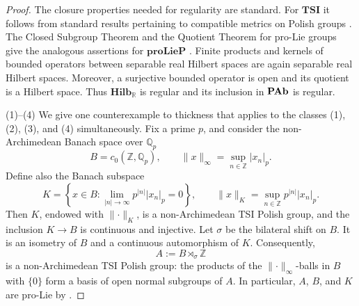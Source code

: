 \documentclass[12pt]{amsart}
\theoremstyle{definition}
\begin{document}
\begin{proof}
The closure properties needed for regularity are standard. For $\mathbf{TSI}$
it follows from standard results pertaining to compatible metrics on Polish
groups \cite[Section~2.2]{gao_invariant_2009}. The Closed Subgroup Theorem
and the Quotient Theorem for pro-Lie groups give the analogous assertions
for $\mathbf{proLieP}$ \cite[Chapter~3 and Theorem~4.1]{hofmann_lie_2007}.
Finite products and kernels of bounded operators between separable real
Hilbert spaces are again separable real Hilbert spaces. Moreover, a
surjective bounded operator is open and its quotient is a Hilbert space.
Thus $\mathbf{Hilb}_{\mathbb{R}}$ is regular and its inclusion in $\mathbf{%
PAb}$ is regular.

(1)--(4) We give one counterexample to thickness that applies to the classes
(1), (2), (3), and (4) simultaneously. Fix a prime $p$, and consider the
non-Archimedean Banach space over $\mathbb{Q}_{p}$ 
\begin{equation*}
B=c_{0}(\mathbb{Z},\mathbb{Q}_{p}),\qquad \lVert x\rVert _{\infty
}=\sup_{n\in \mathbb{Z}}\lvert x_{n}\rvert _{p}.
\end{equation*}%
Define also the Banach subspace 
\begin{equation*}
K=\left\{ x\in B:\lim_{\lvert n\rvert \rightarrow \infty }p^{\lvert n\rvert
}\lvert x_{n}\rvert _{p}=0\right\},\qquad \lVert x\rVert _{K}=\sup_{n\in 
\mathbb{Z}}p^{\lvert n\rvert }\lvert x_{n}\rvert _{p}.
\end{equation*}%
Then $K$, endowed with $\lVert \cdot \rVert _{K}$, is a non-Archimedean TSI
Polish group, and the inclusion $K\rightarrow B$ is continuous and
injective. Let $\sigma $ be the bilateral shift on $B$. It is an isometry of 
$B$ and a continuous automorphism of $K$. Consequently, 
\begin{equation*}
A:=B\rtimes _{\sigma }\mathbb{Z}
\end{equation*}%
is a non-Archimedean TSI Polish group: the products of the $\lVert \cdot
\rVert _{\infty }$-balls in $B$ with $\{0\}$ form a basis of open normal
subgroups of $A$. In particular, $A$, $B$, and $K$ are pro-Lie by \cite[%
Theorem~1.1]{gao_non-archimedean_2014}.


\end{proof}
\end{document}
